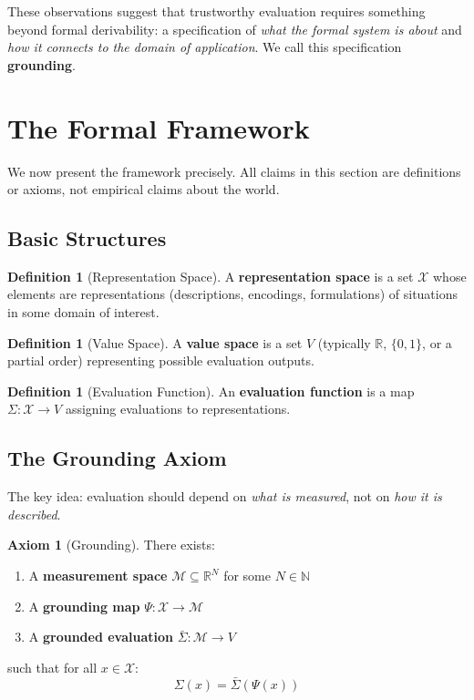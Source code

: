 \documentclass[12pt]{article}
\theoremstyle{definition}
\newtheorem{definition}[theorem]{Definition}
\newtheorem{axiom}{Axiom}
\theoremstyle{remark}
\newcommand{\calX}{\mathcal{X}}
\newcommand{\calM}{\mathcal{M}}
\newcommand{\Sigmabar}{\bar{\Sigma}}
\begin{document}
These observations suggest that trustworthy evaluation requires something beyond formal derivability: a specification of \emph{what the formal system is about} and \emph{how it connects to the domain of
application}. We call this specification \textbf{grounding}.

\section{The Formal Framework}

We now present the framework precisely. All claims in this section are definitions or axioms,
not empirical claims about the world.

\subsection{Basic Structures}

\begin{definition}[Representation Space]\label{def:rep-space}
A \textbf{representation space} is a set $\calX$ whose elements are
representations (descriptions, encodings, formulations) of situations in some domain of interest.
\end{definition}

\begin{definition}[Value Space]\label{def:val-space}
A \textbf{value space} is a set $V$ (typically $\mathbb{R}$, $\{0,1\}$, or a partial order)
representing possible evaluation outputs.
\end{definition}

\begin{definition}[Evaluation Function]\label{def:eval-func}
An \textbf{evaluation function} is a map $\Sigma : \calX \to V$ assigning
evaluations to representations.
\end{definition}

\subsection{The Grounding Axiom}

The key idea: evaluation should depend on \emph{what is measured}, not on \emph{how it is described}.

\begin{axiom}[Grounding]\label{ax:grounding}
There exists:
\begin{enumerate}[label=(\alph*)]
    \item A \textbf{measurement space} $\calM \subseteq \mathbb{R}^N$ for some $N \in \mathbb{N}$
    \item A \textbf{grounding map} $\Psi : \calX \to \calM$
    \item A \textbf{grounded evaluation} $\Sigmabar : \calM \to V$
\end{enumerate}
such that for all $x \in \calX$:
\[
    \Sigma(x) = \Sigmabar(\Psi(x))
\]
\end{axiom}
\end{document}
